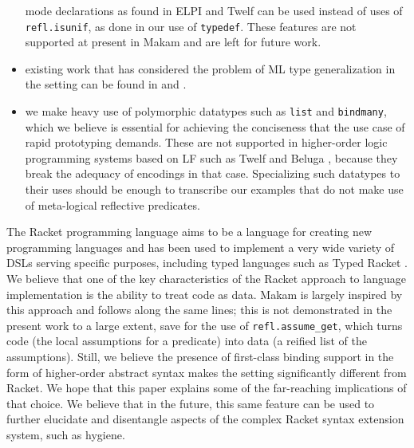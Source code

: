\begin{itemize}
  mode declarations as found in ELPI and Twelf
  \citep{twelf-main-reference} can be used instead of uses of
  \texttt{refl.isunif}, as done in our use of \texttt{typedef}. These
  features are not supported at present in Makam and are left for future
  work.
\item
  existing work that has considered the problem of ML type
  generalization in the \lamprolog setting can be found in
  \citet{typgen-lamprolog-1} and \citet{typgen-lamprolog-2}.
\item
  we make heavy use of polymorphic datatypes such as \texttt{list} and
  \texttt{bindmany}, which we believe is essential for achieving the
  conciseness that the use case of rapid prototyping demands. These are
  not supported in higher-order logic programming systems based on LF
  \citep{lf-main-reference} such as Twelf \citep{twelf-main-reference}
  and Beluga \citep{beluga-main-reference}, because they break the
  adequacy of encodings in that case. Specializing such datatypes to
  their uses should be enough to transcribe our examples that do not
  make use of meta-logical reflective predicates.
\end{itemize}

 The Racket programming language aims to be a language
for creating new programming languages \citep{racket-manifesto} and has
been used to implement a very wide variety of DSLs serving specific
purposes, including typed languages such as Typed Racket
\citet{typed-racket-main-reference}. We believe that one of the key
characteristics of the Racket approach to language implementation is the
ability to treat code as data. Makam is largely inspired by this
approach and follows along the same lines; this is not demonstrated in
the present work to a large extent, save for the use of
\texttt{refl.assume\_get}, which turns code (the local assumptions for a
predicate) into data (a reified list of the assumptions). Still, we
believe the presence of first-class binding support in the form of
higher-order abstract syntax makes the \lamprolog setting significantly
different from Racket. We hope that this paper explains some of the
far-reaching implications of that choice. We believe that in the future,
this same feature can be used to further elucidate and disentangle
aspects of the complex Racket syntax extension system, such as hygiene.

